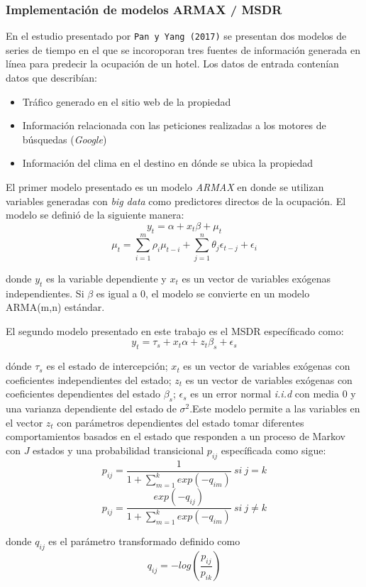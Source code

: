 {\subsubsection*{Implementación de modelos ARMAX / MSDR}

En el estudio presentado por \texttt{Pan y Yang (2017)} se presentan dos modelos de series de tiempo en el que se incoroporan tres fuentes de información generada en línea para predecir la ocupación de un hotel. Los datos de entrada contenían datos que describían:
\begin{itemize}
  \item Tráfico generado en el sitio web de la propiedad
  \item Información relacionada con las peticiones realizadas a los motores de búsquedas (\emph{Google})
  \item Información del clima en el destino en dónde se ubica la propiedad
\end{itemize}


El primer modelo presentado es un modelo \emph{ARMAX} en donde se utilizan variables generadas con \emph{big data} como predictores directos de la ocupación. El modelo se definió de la siguiente manera: $$y_t = \alpha + x_t \beta + \mu_t$$ $$\mu_t = \sum_{i=1}^{m} \rho_i \mu_{t-i} + \sum_{j=1}^{n} \theta_j \epsilon_{t-j} + \epsilon_i$$

donde $y_t$ es la variable dependiente y $x_t$ es un vector de variables exógenas independientes. Si $\beta$ es igual a 0, el modelo se convierte en un modelo ARMA(m,n) estándar.

El segundo modelo presentado en este trabajo es el MSDR específicado como: $$y_t = \tau_s + x_t \alpha + z_t \beta_s + \epsilon_s$$

dónde $\tau_s$ es el estado de intercepción; $x_t$ es un vector de variables exógenas con coeficientes independientes del estado; $z_t$ es un vector de variables exógenas con coeficientes dependientes del estado $\beta_s$; $\epsilon_s$ es un error normal \emph{i.i.d} con media 0 y una varianza dependiente del estado de $\sigma^2$.Este modelo permite a las variables en el vector $z_t$ con parámetros dependientes del estado tomar diferentes comportamientos basados en el estado que responden a un proceso de Markov con $J$ estados y una probabilidad transicional $p_{ij}$ específicada como sigue: $$p_{ij} = \frac{1}{1 + \sum_{m=1}^{k} exp(-q_{im})}\ si\ j = k$$ $$p_{ij} = \frac{exp(-q_{ij})}{1 + \sum_{m=1}^{k} exp(-q_{im})}\ si\ j \neq k$$

donde $q_{ij}$ es el parámetro transformado definido como $$q_{ij}=-log(\frac{p_{ij}}{p_{ik}})$$

}
